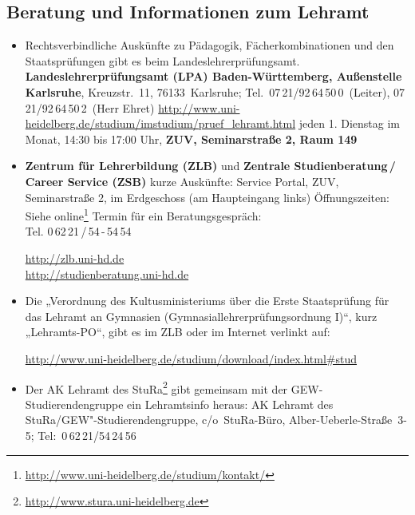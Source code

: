 \newpage\subsection{\Large Beratung und Informationen zum Lehramt}%
\begin{itemize}
\item Rechtsverbindliche Auskünfte zu Pädagogik, Fächerkombinationen und
      den Staatsprüfungen gibt es beim Landeslehrerprüfungsamt. \newline
      \textbf{Landeslehrerprüfungsamt (LPA) Baden-Württemberg,
           Außenstelle Karlsruhe},
      Kreuzstr.~11, 76133~Karlsruhe; \newline
Tel.~07\,21/92\,64\,50\,0~(Leiter), 07\,21/92\,64\,50\,2~(Herr Ehret) \newline
      \url{http://www.uni-heidelberg.de/studium/imstudium/pruef_lehramt.html} \newline
      jeden 1. Dienstag im Monat, 14:30 bis 17:00 Uhr,
      \textbf{\gls{ZUV}, Seminarstraße 2, Raum 149}


\item \textbf{Zentrum für Lehrerbildung (ZLB)} und \textbf{Zentrale Studienberatung\,/\,Career Service (ZSB)} \newline
      kurze Auskünfte: Service Portal, \gls{ZUV}, Seminarstraße 2, im Erdgeschoss (am Haupteingang links)
      Öffnungszeiten: Siehe online\footnote{\url{http://www.uni-heidelberg.de/studium/kontakt/}} \newline
      Termin für ein Beratungsgespräch: \\ Tel. 0\,62\,21\,/\,54\,-\,54\,54

      \url{http://zlb.uni-hd.de}\\
      \url{http://studienberatung.uni-hd.de}

\item Die „Verordnung des Kultusministeriums über die Erste Staatsprüfung für das Lehramt an Gymnasien (Gymnasiallehrerprüfungsordnung I)“, kurz „Lehramts-PO“, gibt es im ZLB oder im Internet verlinkt auf:

      \url{http://www.uni-heidelberg.de/studium/download/index.html#stud}


\item Der AK Lehramt des StuRa\footnote{\url{http://www.stura.uni-heidelberg.de}} gibt gemeinsam mit der  GEW-Stu\-dier\-en\-den\-grup\-pe ein Lehramtsinfo heraus: \newline AK Lehramt des StuRa/GEW"-Studierendengruppe, c/o~StuRa-Büro, Alber-Ueberle-Straße~3-5; Tel:~0\,62\,21/54\,24\,56


\end{itemize}
